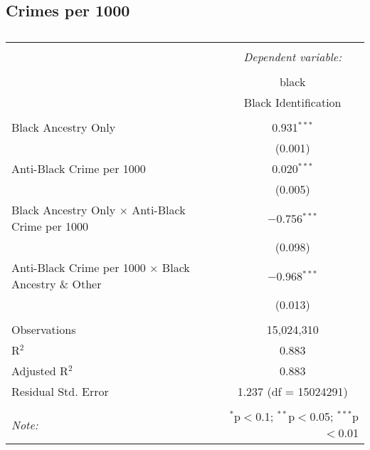 \documentclass{article}
\begin{document}
\subsection{Crimes per 1000}
    \begin{table}[!htbp] \centering 
      \caption{} 
      \label{} 
    \begin{tabular}{@{\extracolsep{5pt}}lc} 
    \\[-1.8ex]\hline 
    \hline \\[-1.8ex] 
     & \multicolumn{1}{c}{\textit{Dependent variable:}} \\ 
    \cline{2-2} 
    \\[-1.8ex] & black \\ 
     & Black Identification \\ 
    \hline \\[-1.8ex] 
     Black Ancestry Only & 0.931$^{***}$ \\ 
      & (0.001) \\ 
     Anti-Black Crime per 1000 & 0.020$^{***}$ \\ 
      & (0.005) \\ 
     Black Ancestry Only $\times$ Anti-Black Crime per 1000 & $-$0.756$^{***}$ \\ 
      & (0.098) \\ 
     Anti-Black Crime per 1000 $\times$ Black Ancestry \& Other & $-$0.968$^{***}$ \\
      & (0.013) \\ 
    \hline \\[-1.8ex] 
    Observations & 15,024,310 \\ 
    R$^{2}$ & 0.883 \\ 
    Adjusted R$^{2}$ & 0.883 \\ 
    Residual Std. Error & 1.237 (df = 15024291) \\ 
    \hline 
    \hline \\[-1.8ex] 
    \textit{Note:}  & \multicolumn{1}{r}{$^{*}$p$<$0.1; $^{**}$p$<$0.05; $^{***}$p$<$0.01} \\ 
    \end{tabular} 
    \end{table} 
    
\end{document}
